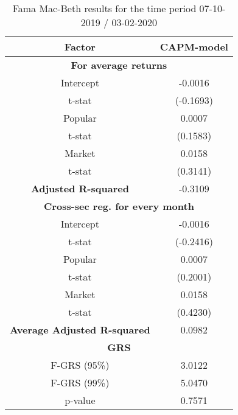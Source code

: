 \begin{table}[h!]
	\centering
	\captionsetup{skip=0.5\baselineskip}
	\caption{Fama Mac-Beth results for the time period 07-10-2019 / 03-02-2020}
	\begin{tabular}{|c|c|}
		\hline
		\textbf{Factor} & \textbf{CAPM-model} \\ \hline
		\multicolumn{2}{|c|}{\textbf{For average returns}} \\ \hline
		Intercept & -0.0016 \\ 
		t-stat & (-0.1693) \\ \hline
		Popular & 0.0007 \\ 
		t-stat & (0.1583)\\ \hline
		Market & 0.0158 \\
		t-stat & (0.3141)\\ \hline
		\textbf{Adjusted R-squared} & -0.3109 \\ \hline
		\multicolumn{2}{|c|}{\textbf{Cross-sec reg. for every month}} \\ \hline
		Intercept & -0.0016 \\ 
		t-stat & (-0.2416) \\ \hline
		Popular & 0.0007 \\ 
		t-stat & (0.2001)\\ \hline
		Market & 0.0158 \\
		t-stat & (0.4230)\\ \hline
		\textbf{Average Adjusted R-squared} & 0.0982 \\ \hline
		\multicolumn{2}{|c|}{\textbf{GRS}} \\ \hline
		F-GRS (95\%) & 3.0122 \\ \hline
		F-GRS (99\%) & 5.0470 \\ \hline
		p-value & 0.7571 \\ \hline
	\end{tabular}
\end{table}

